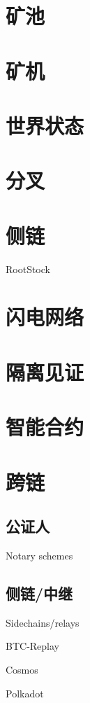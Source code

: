 \documentclass[UTF8]{ctexart}
\begin{document}
\section{矿池}

\section{矿机}

\section{世界状态}

\section{分叉}

\section{侧链}

RootStock

\section{闪电网络}

\section{隔离见证}

\section{智能合约}

\section{跨链}

\subsection{公证人}
Notary schemes

\subsection{侧链/中继}
Sidechains/relays

BTC-Replay

Cosmos

Polkadot
\end{document}
